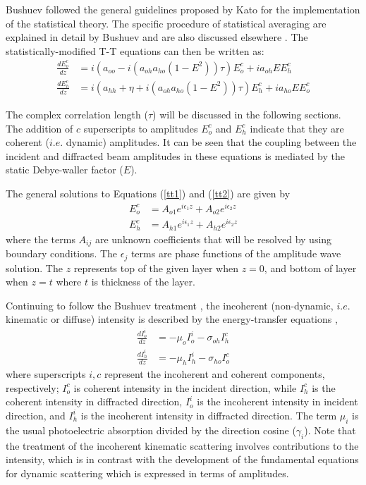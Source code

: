 Bushuev followed the general guidelines proposed by Kato \cite{Kato1,Kato2} for the implementation of the statistical theory.  The specific procedure of statistical averaging are explained in detail by Bushuev \cite{Bushuev1,Bushuev2} and are also discussed elsewhere \cite{Ming1,An1,Punegov15,Punegov12,Punegov7,Punegov2,Punegov13,Punegov1,Punegov9,Authier1}.  The statistically-modified T-T equations can then be written as:
\begin{align}
\frac{dE^c_o}{dz}&=i (a_{oo} - i  (a_{oh}a_{ho}(1-E^2)) \tau)E_o^c + i a_{oh} EE^c_h\label{tt1}\\
\frac{dE^c_h}{dz}&=i (a_{hh} + \eta +i(a_{oh}a_{ho}(1-E^2)) \tau) E^c_h +i a_{ho} E E^c_o\label{tt2}
\end{align}

The complex correlation length ($\tau$) will be discussed in the following sections.  The addition of $c$ superscripts to amplitudes $E^c_o$ and $E^c_h$ indicate that they are coherent ($i.e.$ dynamic) amplitudes.  It can be seen that the coupling between the incident and diffracted beam amplitudes in these equations is mediated by the static Debye-waller factor ($E$).

The general solutions to Equations (\ref{tt1}) and (\ref{tt2}) are given by
\begin{align}
E_o^c &= A_{o1} e^{i \epsilon_1 z} + A_{o2} e^{i \epsilon_2 z } \label{sol1}\\
E_h^c &=  A_{h1} e^{i \epsilon_1 z} +  A_{h2} e^{i \epsilon_2 z }\label{sol2}
\end{align}
where the terms $A_{ij}$ are unknown coefficients that will be resolved by using boundary conditions.  The $\epsilon_j$ terms are phase functions of the amplitude wave solution.  The $z$ represents top of the given layer when $z=0$, and bottom of layer when $z=t$ where $t$ is thickness of the layer.  

Continuing to follow the Bushuev treatment \cite{Bushuev1,Bushuev2}, the incoherent (non-dynamic, $i.e.$ kinematic or diffuse) intensity is described by the energy-transfer equations \cite{KatoI},
\begin{align}
\frac{dI^i_o}{dz} &=-\mu_o I^i_o-\sigma_{oh} I^c_{h}\\
\frac{dI^i_h}{dz} &=-\mu_h I^i_h-\sigma_{ho} I^c_{o}
\end{align}
where superscripts $i,c$ represent the incoherent and coherent components, respectively; $I_o^c$ is coherent intensity in the incident direction, while $I_h^c$ is the coherent intensity in diffracted direction, $I_o^i$ is the incoherent intensity in incident direction, and $I_h^i$ is the incoherent intensity in diffracted direction.  The term $\mu_i$ is the usual photoelectric absorption divided by the direction cosine ($\gamma_i$).  Note that the treatment of the incoherent kinematic scattering involves contributions to the intensity, which is in contrast with the development of the fundamental equations for dynamic scattering which is expressed in terms of amplitudes.

